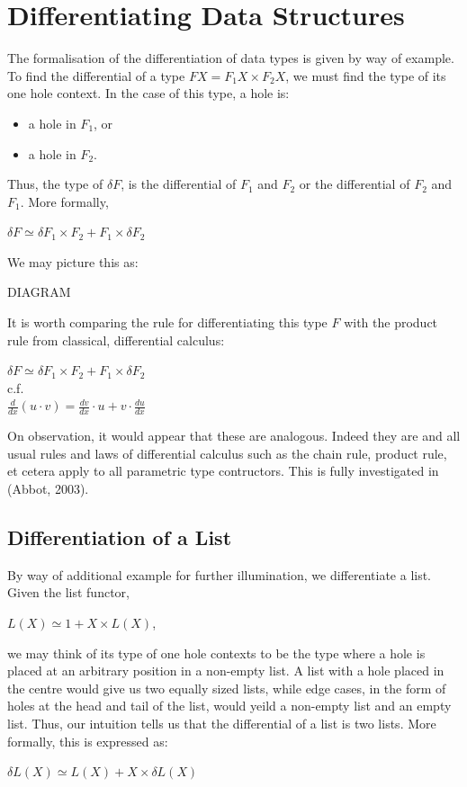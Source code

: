 \documentclass[12pt]{report}
\begin{document}
\section{Differentiating Data Structures}
The formalisation of the differentiation of data types is given by way of example. To find the differential of a type $FX = F_{1}X \times F_{2}X$, we must find the type of its one hole context. In the case of this type, a hole is:
\begin{itemize}
\item a hole in $F_{1}$, or
\item a hole in $F_{2}$.
\end{itemize}
Thus, the type of $\delta F$, is the differential of $F_{1}$ and $F_{2}$ or the differential of $F_{2}$ and $F_{1}$. More formally,
\begin{center}
$\delta F \simeq \delta F_{1} \times F_{2} + F_{1} \times \delta F_{2} $
\end{center}
We may picture this as:
\begin{center}
DIAGRAM
\end{center}
It is worth comparing the rule for differentiating this type $F$ with the product rule from classical, differential calculus:
\begin{center}
$\delta F \simeq \delta F_{1} \times F_{2} + F_{1} \times \delta F_{2} $\\
c.f.\\
$\frac{d}{dx} (u \cdot v)= \frac{dv}{dx} \cdot u + v \cdot \frac{du}{dx}$
\end{center} 
On observation, it would appear that these are analogous. Indeed they are and all usual rules and laws of differential calculus such as the chain rule, product rule, et cetera apply to all parametric type contructors. This is fully investigated in (Abbot, 2003).
\subsection{Differentiation of a List}
By way of additional example for further illumination, we differentiate a list. Given the list functor,
\begin{center}
$L(X) \simeq 1 + X \times L(X)$,
\end{center} 
we may think of its type of one hole contexts to be the type where a hole is placed at an arbitrary position in a non-empty list. A list with a hole placed in the centre would give us two equally sized lists, while edge cases, in the form of holes at the head and tail of the list, would yeild a non-empty list and an empty list. Thus, our intuition tells us that the differential of a list is two lists. More formally, this is expressed as:
\begin{center}
$\delta L(X) \simeq L(X) + X \times \delta L(X)$
\end{center}
\end{document}
